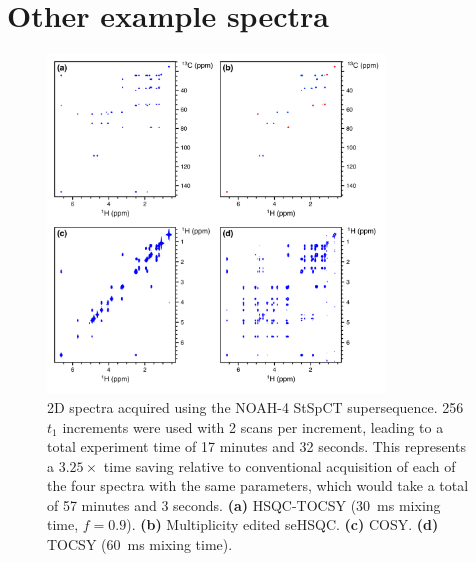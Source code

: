 \section{Other example spectra}
\label{section:si_spectra}

\begin{figure}
    \centering
    \includegraphics[width=0.8\textwidth]{./figures/stspct.png}
    \caption{
        2D spectra acquired using the NOAH-4 StSpCT supersequence.
        256 $t_1$ increments were used with 2 scans per increment, leading to a total experiment time of 17 minutes and 32 seconds.
        This represents a $3.25\times$ time saving relative to conventional acquisition of each of the four spectra with the same parameters, which would take a total of 57 minutes and 3 seconds.
        \textbf{(a)} HSQC-TOCSY (\SI{30}{ms} mixing time, $f = 0.9$).
        \textbf{(b)} Multiplicity edited seHSQC.
        \textbf{(c)} COSY.
        \textbf{(d)} TOCSY (\SI{60}{ms} mixing time).
        \andro{}
    }
    \label{fig:stspct}
\end{figure}

